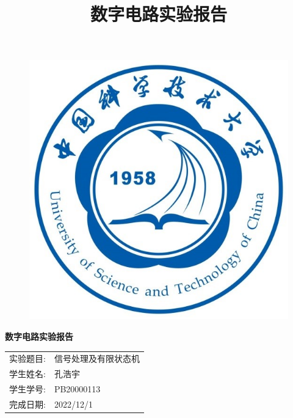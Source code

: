 \documentclass{article}
\title{\heiti 数字电路实验报告 }
\begin{document}
	\vspace*{1cm}
	
	\begin{figure}[h]
		\centering
		\includegraphics[scale=1.0]{xh.jpg}
	\end{figure}

	\vspace*{0.5cm}
	
	\begin{center}
		\Huge{\textbf{数字电路实验报告}}
	\end{center}
	
	\vspace{5cm}
	
	\begin{table}[h]
		\centering
		\begin{Large}
			\begin{tabular}{p{3cm} p{7cm}<{\centering}}
				实验题目: &   信号处理及有限状态机     \\ \cline{2-2}
				学生姓名:      & 孔浩宇   \\ \cline{2-2}
				学生学号: & PB20000113 \\ \cline{2-2}
				完成日期:       & 2022/12/1 \\ \cline{2-2}
			\end{tabular}
		\end{Large}		
	\end{table}
	\newpage
\end{document}
